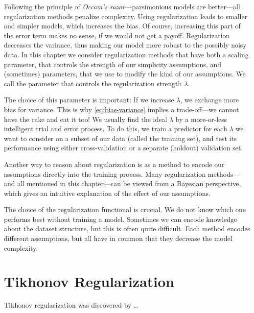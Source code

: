 Following the principle of \emph{Occam's razor}---parsimonious models are better---all regularization methods penalize complexity.
Using regularization leads to smaller and simpler models, which increases the bias.
Of course, increasing this part of the error term makes no sense, if we would not get a payoff.
Regularization decreases the variance, thus making our model more robust to the possibly noisy data.
In this chapter we consider regularization methods that have both a scaling
parameter, that controls the strength of our simplicity assumptions, and (sometimes) parameters, that we use to modify the kind of our assumptions.
We call the parameter that controls the regularization strength \(\lambda\).

The choice of this parameter is important:
If we increase \(\lambda\), we exchange more bias for variance.
This is why \cref{eq:bias-variance} implies a trade-off---we cannot have the cake and eat it too!
We usually find the ideal \(\lambda\) by a more-or-less intelligent trial and error process.
To do this, we train a predictor for each \(\lambda\) we want to consider on a subset of our data (called the training set), and test its performance using either cross-validation or a separate (holdout) validation set. 

Another way to reason about regularization is as a method to encode our
assumptions directly into the training process.
Many regularization methods---and all mentioned in this chapter---can be
viewed from a Bayesian perspective, which gives an intuitive explanation of the
effect of our assumptions.

The choice of the regularization functional is crucial.
We do not know which one performs best without training a model.
Sometimes we can encode knowledge about the dataset structure, but this is often
quite difficult.
Each method encodes different assumptions, but all have in common that they
decrease the model complexity.

\section{Tikhonov Regularization}\label{cha:tikh}
Tikhonov regularization was discovered by \ldots
